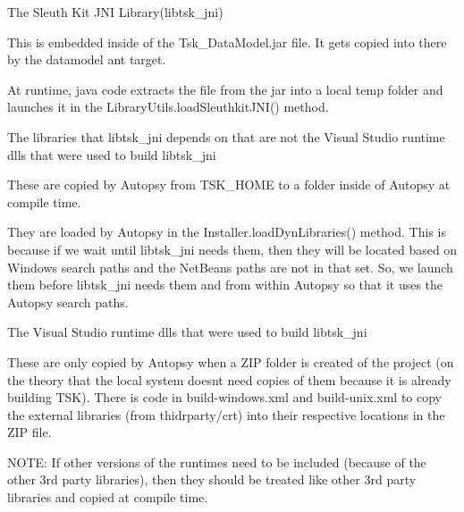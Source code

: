 \begin{DoxyItemize}
\item The Sleuth Kit J\+NI Library(libtsk\+\_\+jni)
\begin{DoxyItemize}
\item This is embedded inside of the {\ttfamily Tsk\+\_\+\+Data\+Model.\+jar} file. It gets copied into there by the datamodel ant target.
\item At runtime, java code extracts the file from the jar into a local temp folder and launches it in the Library\+Utils.\+load\+Sleuthkit\+J\+N\+I() method.
\end{DoxyItemize}
\item The libraries that libtsk\+\_\+jni depends on that are not the Visual Studio runtime dlls that were used to build libtsk\+\_\+jni
\begin{DoxyItemize}
\item These are copied by Autopsy from T\+S\+K\+\_\+\+H\+O\+ME to a folder inside of Autopsy at compile time.
\item They are loaded by Autopsy in the Installer.\+load\+Dyn\+Libraries() method. This is because if we wait until {\ttfamily libtsk\+\_\+jni} needs them, then they will be located based on Windows search paths and the Net\+Beans paths are not in that set. So, we launch them before {\ttfamily libtsk\+\_\+jni} needs them and from within Autopsy so that it uses the Autopsy search paths.
\end{DoxyItemize}
\item The Visual Studio runtime dlls that were used to build libtsk\+\_\+jni
\begin{DoxyItemize}
\item These are only copied by Autopsy when a Z\+IP folder is created of the project (on the theory that the local system doesn\textquotesingle{}t need copies of them because it is already building T\+SK). There is code in build-\/windows.\+xml and build-\/unix.\+xml to copy the external libraries (from thidrparty/crt) into their respective locations in the Z\+IP file.
\item N\+O\+TE\+: If other versions of the runtimes need to be included (because of the other 3rd party libraries), then they should be treated like other 3rd party libraries and copied at compile time. 
\end{DoxyItemize}
\end{DoxyItemize}